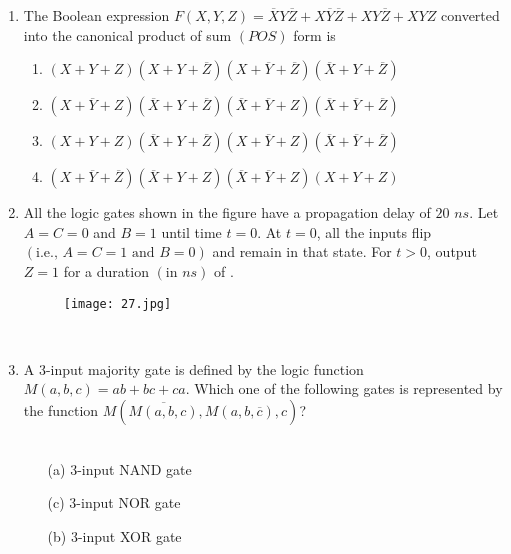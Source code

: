 \documentclass[12pt,-letter paper]{article}
\providecommand{\brak}[1]{\ensuremath{\left(#1\right)}}
\theoremstyle{remark}
\begin{document}
\begin{enumerate}
 \item The Boolean expression $F\brak{X,Y,Z} = \overline{X}Y\overline{Z}+X\overline{Y}\overline{Z}+XY\overline{Z}+XYZ$ converted into the canonical product of sum \brak{POS} form is
 \begin{enumerate}
     \item $\brak{X+Y+Z}\brak{X+Y+\overline{Z}}\brak{X+\overline{Y}+\overline{Z}}\brak{\overline{X}+Y+\overline{Z}}$
     \item $\brak{X+\overline{Y}+Z}\brak{\overline{X}+Y+\overline{Z}}\brak{\overline{X}+\overline{Y}+Z}\brak{\overline{X}+\overline{Y}+\overline{Z}}$
     \item $\brak{X+Y+Z}\brak{\overline{X}+Y+\overline{Z}}\brak{X+\overline{Y}+Z}\brak{\overline{X}+\overline{Y}+\overline{Z}}$
     \item $\brak{X+\overline{Y}+\overline{Z}}\brak{\overline{X}+Y+Z}\brak{\overline{X}+\overline{Y}+Z}\brak{X+Y+Z}$
 \end{enumerate}
 \item All the logic gates shown in the figure have a propagation delay of $20$ $ns$. Let $A = C = 0$ and $B = 1$ until time $t = 0$. At $t = 0$, all the inputs flip \brak{\text{i.e., $A = C = 1$ and $B = 0$}} and remain in that state. For $t > 0$, output $Z = 1$ for a duration \brak{\text{in $ns$}} of \underline{\hspace{2cm}}.
    \begin{figure}[h]
        \centering
        \texttt{[image: 27.jpg]}
    \end{figure}\\
 \item A 3-input majority gate is defined by the logic function $M\brak{a,b,c} = ab+bc+ca$. Which one of the following gates is represented by the function $M\brak{\overline{M\brak{a,b,c}},M\brak{a,b,\overline{c}},c}$?\\ \\
    \begin{minipage}[t]{.5\textwidth}
\begin{itemize}
\item[(a)] 3-input NAND gate
\item[(c)] 3-input NOR gate
\end{itemize}
\end{minipage}
\hfill %
\begin{minipage}[t]{.5\textwidth}
\begin{itemize}
\item[(b)] 3-input XOR gate

\end{itemize}
\end{minipage}
\end{enumerate}
\end{document}
